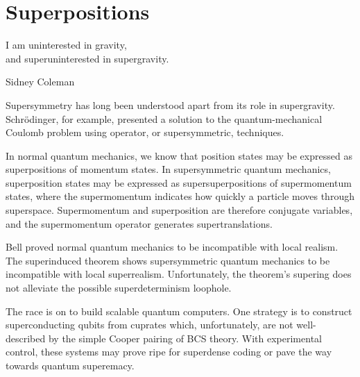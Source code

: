 \section{Superpositions}
\epigraph{I am uninterested in gravity,\\
and superuninterested in supergravity.}{Sidney Coleman\cite{vanNieuwenhuizen:2016}}

Supersymmetry has long been understood apart from its role in supergravity.
Schr\"{o}dinger, for example, presented a solution\cite{10.2307/20490744} to the quantum-mechanical Coulomb problem using operator, or supersymmetric, techniques\cite{RevModPhys.23.21}.

In normal quantum mechanics, we know that position states may be expressed as superpositions of momentum states.
In supersymmetric quantum mechanics, superposition states may be expressed as supersuperpositions of supermomentum states, where the supermomentum indicates how quickly a particle moves through superspace.
Supermomentum and superposition are therefore conjugate variables, and the supermomentum operator generates supertranslations.

Bell proved normal quantum mechanics to be incompatible with local realism\cite{bell1964einstein}.
The superinduced theorem shows supersymmetric quantum mechanics to be incompatible with local superrealism.
Unfortunately, the theorem's supering does not alleviate the possible superdeterminism loophole.

The race is on to build scalable quantum computers.
One strategy is to construct superconducting qubits from cuprates which, unfortunately, are not well-described by the simple Cooper pairing of BCS theory\cite{Bardeen:1957kj}.
With experimental control, these systems may prove ripe for superdense coding\cite{PhysRevLett.69.2881} or pave the way towards quantum superemacy\cite{Preskill:2012tg}.
